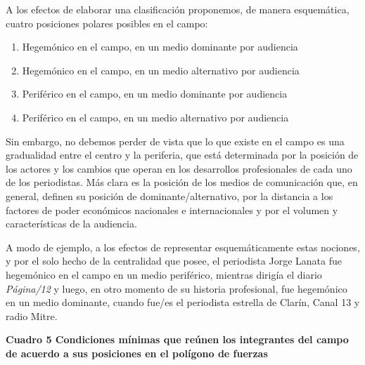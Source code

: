 A los efectos de elaborar una clasificación proponemos, de manera esquemática, cuatro posiciones polares posibles en el campo:

\begin{enumerate}
\def\labelenumi{\arabic{enumi})}
\item
  Hegemónico en el campo, en un medio dominante por audiencia
\item
  Hegemónico en el campo, en un medio alternativo por audiencia
\item
  Periférico en el campo, en un medio dominante por audiencia
\item
  Periférico en el campo, en un medio alternativo por audiencia
\end{enumerate}

Sin embargo, no debemos perder de vista que lo que existe en el campo es una gradualidad entre el centro y la periferia, que está determinada por la posición de los actores y los cambios que operan en los desarrollos profesionales de cada uno de los periodistas. Más clara es la posición de los medios de comunicación que, en general, definen su posición de dominante/alternativo, por la distancia a los factores de poder económicos nacionales e internacionales y por el volumen y características de la audiencia.

A modo de ejemplo, a los efectos de representar esquemáticamente estas nociones, y por el solo hecho de la centralidad que posee, el periodista Jorge Lanata fue hegemónico en el campo en un medio periférico, mientras dirigía el diario \emph{Página/12} y luego, en otro momento de su historia profesional, fue hegemónico en un medio dominante, cuando fue/es el periodista estrella de Clarín, Canal 13 y radio Mitre.

\textbf{Cuadro 5 Condiciones mínimas que reúnen los integrantes del campo de acuerdo a sus posiciones en el polígono de fuerzas}

